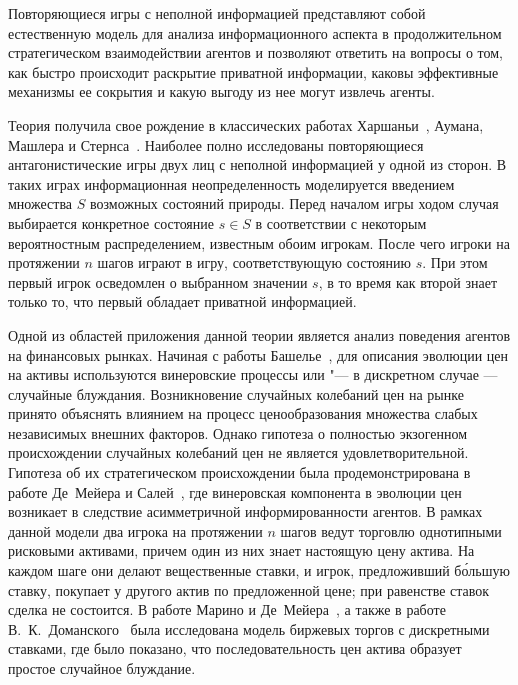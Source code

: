 {\actuality}
Повторяющиеся игры с неполной информацией представляют собой естественную модель для анализа информационного аспекта в продолжительном стратегическом взаимодействии агентов и позволяют ответить на вопросы о том, как быстро происходит раскрытие приватной информации, каковы эффективные механизмы ее сокрытия и какую выгоду из нее могут извлечь агенты.

Теория получила свое рождение в классических работах Харшаньи~\cite{harsanyi67}, Аумана, Машлера и Стернса~\cite{aumann95}. 
Наиболее полно исследованы повторяющиеся антагонистические игры двух лиц с неполной информацией у одной из сторон. 
В таких играх информационная неопределенность моделируется введением множества $S$ возможных состояний природы. 
Перед началом игры ходом случая выбирается конкретное состояние $s \in S$ в соответствии с некоторым вероятностным распределением, известным обоим игрокам.
После чего игроки на протяжении $n$ шагов играют в игру, соответствующую состоянию $s$.
При этом первый игрок осведомлен о выбранном значении $s$, в то время как второй знает только то, что первый обладает приватной информацией.

Одной из областей приложения данной теории является анализ поведения агентов на финансовых рынках.
Начиная с работы Башелье~\cite{bachelier1900}, для описания эволюции цен на активы используются винеровские процессы или "--- в дискретном случае --- случайные блуждания.
Возникновение случайных колебаний цен на рынке принято объяснять влиянием на процесс ценообразования множества слабых независимых внешних факторов. 
Однако гипотеза о полностью экзогенном происхождении случайных колебаний цен не является удовлетворительной. 
Гипотеза об их стратегическом происхождении была продемонстрирована в работе Де~Мейера и Салей~\cite{demeyer02}\label{demeyer02ref}, где винеровская компонента в эволюции цен возникает в следствие асимметричной информированности агентов. 
В рамках данной модели два игрока на протяжении $n$ шагов ведут торговлю однотипными рисковыми активами, причем один из них знает настоящую цену актива. 
На каждом шаге они делают вещественные ставки, и игрок, предложивший б\'{о}льшую ставку, покупает у
другого актив по предложенной цене; при равенстве ставок сделка не состоится.
В работе Марино и Де~Мейера~\cite{demeyer05}, а также в работе В.~К.~Доманского~\cite{domansky07}\label{domansky07ref} была исследована модель биржевых торгов с дискретными ставками, где было показано, что последовательность цен актива образует простое случайное блуждание.

